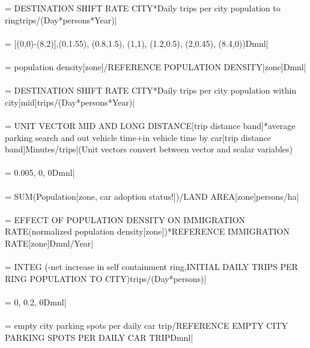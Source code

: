  = {\small DESTINATION SHIFT RATE CITY*Daily trips per city population to ringtrips/(Day*persons*Year)|} \\ \\ 
 = {\small [(0,0)-(8,2)],(0,1.55), (0.8,1.5), (1,1), (1.2,0.5), (2,0.45), (8.4,0))Dmnl|} \\ \\ 
 = {\small population density[zone]/REFERENCE POPULATION DENSITY[zone]Dmnl|} \\ \\ 
 = {\small DESTINATION SHIFT RATE CITY*Daily trips per city population within city[mid]trips/(Day*persons*Year)|} \\ \\ 
 = {\small UNIT VECTOR MID AND LONG DISTANCE[trip distance band]*average parking search and out vehicle time+in vehicle time by car[trip distance band]Minutes/trips|}{\small  (Unit vectors convert between vector and scalar variables)} \\ \\ 
 = {\small 0.005, 0, 0Dmnl|} \\ \\ 
 = {\small SUM(Population[zone, car adoption status!])/LAND AREA[zone]persons/ha|} \\ \\ 
 = {\small EFFECT OF POPULATION DENSITY ON IMMIGRATION RATE(normalized population density[zone])*REFERENCE IMMIGRATION RATE[zone]Dmnl/Year|} \\ \\ 
 = {\small  INTEG (-net increase in self containment ring,INITIAL DAILY TRIPS PER RING POPULATION TO CITY)trips/(Day*persons)|} \\ \\ 
 = {\small 0, 0.2, 0Dmnl|} \\ \\ 
 = {\small empty city parking spots per daily car trip/REFERENCE EMPTY CITY PARKING SPOTS PER DAILY CAR TRIPDmnl|} \\ \\ 
